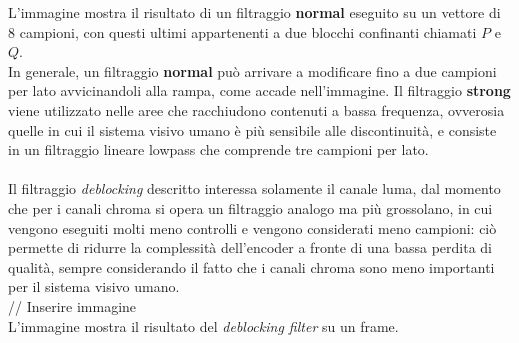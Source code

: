 L'immagine mostra il risultato di un filtraggio \textbf{normal} eseguito su un 
vettore di 8 campioni, con questi ultimi appartenenti a due blocchi confinanti 
chiamati $P$ e $Q$. \\
In generale, un filtraggio \textbf{normal} può arrivare a modificare fino a due
campioni per lato avvicinandoli alla rampa, come accade nell'immagine.
Il filtraggio \textbf{strong} viene utilizzato nelle aree che racchiudono 
contenuti a bassa frequenza, ovverosia quelle in cui il sistema visivo umano è 
più sensibile alle discontinuità, e consiste in un filtraggio lineare lowpass 
che comprende tre campioni per lato.
\\ \\
Il filtraggio \emph{deblocking} descritto interessa solamente il canale luma, 
dal momento che per i canali chroma si opera un filtraggio analogo ma più 
grossolano, in cui vengono eseguiti molti meno controlli e vengono considerati 
meno campioni: ciò permette di ridurre la complessità dell'encoder a fronte di 
una bassa perdita di qualità, sempre considerando il fatto che i canali chroma 
sono meno importanti per il sistema visivo umano.
\\
// Inserire immagine
\\
L'immagine mostra il risultato del \emph{deblocking filter} su un frame.


